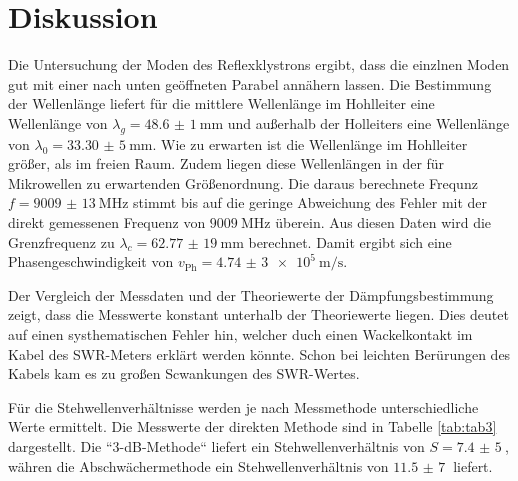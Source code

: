 \section{Diskussion}
\label{sec:Diskussion}
Die Untersuchung der Moden des Reflexklystrons ergibt, dass die einzlnen Moden gut mit einer
nach unten geöffneten Parabel annähern lassen. Die Bestimmung der Wellenlänge liefert für
die mittlere Wellenlänge im Hohlleiter eine Wellenlänge von $\lambda_g=\SI{48,6(1)}{\mm}$ und
außerhalb der Holleiters eine Wellenlänge von $\lambda_0=\SI{33,30(5)}{\mm}$. Wie zu erwarten ist die
Wellenlänge im Hohlleiter größer, als im freien Raum. Zudem liegen diese Wellenlängen in der für
Mikrowellen zu erwartenden Größenordnung. Die daraus berechnete Frequnz $f=\SI{9009(13)}{\MHz}$
stimmt bis auf die geringe Abweichung des Fehler mit der direkt gemessenen Frequenz von $\SI{9009}{\MHz}$
überein. Aus diesen Daten wird die Grenzfrequenz zu $\lambda_c=\SI{62,77(19)}{\mm}$ berechnet.
Damit ergibt sich eine Phasengeschwindigkeit von $v_\text{Ph}=\SI{4,74(3)e5}{\m\per\s}$.

Der Vergleich der Messdaten und der Theoriewerte der Dämpfungsbestimmung zeigt, dass die Messwerte
konstant unterhalb der Theoriewerte liegen. Dies deutet auf einen systhematischen Fehler hin, welcher duch einen
Wackelkontakt im Kabel des SWR-Meters erklärt werden könnte. Schon bei leichten Berürungen des Kabels
kam es zu großen Scwankungen des SWR-Wertes.

Für die Stehwellenverhältnisse werden je nach Messmethode unterschiedliche Werte ermittelt. Die Messwerte der
direkten Methode sind in Tabelle \ref{tab:tab3} dargestellt. Die “3-dB-Methode“ liefert ein Stehwellenverhältnis
von $S=\SI{7,4(5)}{}$, währen die Abschwächermethode ein Stehwellenverhältnis von $\SI{11,5(7)}{}$ liefert.
